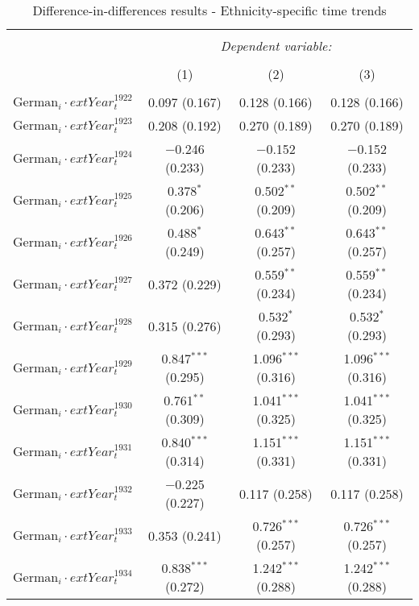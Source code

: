 
\begin{table}[!h] \centering 
  \caption{Difference-in-differences results - Ethnicity-specific time trends} 
  \label{dif_table_trends} 
\small 
\begin{tabular}{@{\extracolsep{5pt}}lccc} 
\\[-1.8ex]\hline 
\hline \\[-1.8ex] 
 & \multicolumn{3}{c}{\textit{Dependent variable:}} \\ 
\cline{2-4} 
\\[-1.8ex] & (1) & (2) & (3)\\ 
\hline \\[-1.8ex] 
 $\text{German}_{i} \cdot 	ext{Year}_{t}^1922$ & 0.097 (0.167) & 0.128 (0.166) & 0.128 (0.166) \\ 
  $\text{German}_{i} \cdot 	ext{Year}_{t}^1923$ & 0.208 (0.192) & 0.270 (0.189) & 0.270 (0.189) \\ 
  $\text{German}_{i} \cdot 	ext{Year}_{t}^1924$ & $-$0.246 (0.233) & $-$0.152 (0.233) & $-$0.152 (0.233) \\ 
  $\text{German}_{i} \cdot 	ext{Year}_{t}^1925$ & 0.378$^{*}$ (0.206) & 0.502$^{**}$ (0.209) & 0.502$^{**}$ (0.209) \\ 
  $\text{German}_{i} \cdot 	ext{Year}_{t}^1926$ & 0.488$^{*}$ (0.249) & 0.643$^{**}$ (0.257) & 0.643$^{**}$ (0.257) \\ 
  $\text{German}_{i} \cdot 	ext{Year}_{t}^1927$ & 0.372 (0.229) & 0.559$^{**}$ (0.234) & 0.559$^{**}$ (0.234) \\ 
  $\text{German}_{i} \cdot 	ext{Year}_{t}^1928$ & 0.315 (0.276) & 0.532$^{*}$ (0.293) & 0.532$^{*}$ (0.293) \\ 
  $\text{German}_{i} \cdot 	ext{Year}_{t}^1929$ & 0.847$^{***}$ (0.295) & 1.096$^{***}$ (0.316) & 1.096$^{***}$ (0.316) \\ 
  $\text{German}_{i} \cdot 	ext{Year}_{t}^1930$ & 0.761$^{**}$ (0.309) & 1.041$^{***}$ (0.325) & 1.041$^{***}$ (0.325) \\ 
  $\text{German}_{i} \cdot 	ext{Year}_{t}^1931$ & 0.840$^{***}$ (0.314) & 1.151$^{***}$ (0.331) & 1.151$^{***}$ (0.331) \\ 
  $\text{German}_{i} \cdot 	ext{Year}_{t}^1932$ & $-$0.225 (0.227) & 0.117 (0.258) & 0.117 (0.258) \\ 
  $\text{German}_{i} \cdot 	ext{Year}_{t}^1933$ & 0.353 (0.241) & 0.726$^{***}$ (0.257) & 0.726$^{***}$ (0.257) \\ 
  $\text{German}_{i} \cdot 	ext{Year}_{t}^1934$ & 0.838$^{***}$ (0.272) & 1.242$^{***}$ (0.288) & 1.242$^{***}$ (0.288) \\ 

\end{tabular}
\end{table}
